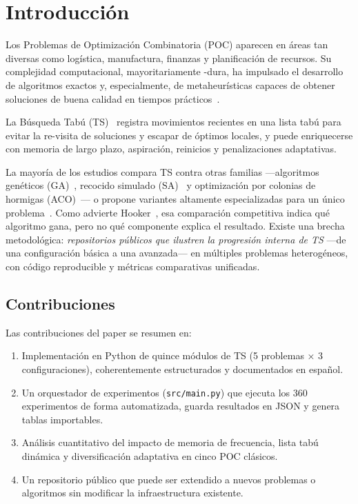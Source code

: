\section{Introducción}
\label{sec:intro}

Los Problemas de Optimización Combinatoria (POC) aparecen en áreas tan
diversas como logística, manufactura, finanzas y planificación de recursos.
Su complejidad computacional, mayoritariamente \NP-dura, ha impulsado el
desarrollo de algoritmos exactos y, especialmente, de metaheurísticas capaces
de obtener soluciones de buena calidad en tiempos
prácticos~\cite{gendreau2010handbook,blum2003metaheuristics}.

La Búsqueda Tabú (TS)~\cite{glover1986future,glover1989tabu,glover1990tabu}
registra movimientos recientes en una lista tabú para evitar la re-visita
de soluciones y escapar de óptimos locales, y puede enriquecerse con
memoria de largo plazo, aspiración, reinicios y penalizaciones adaptativas.

La mayoría de los estudios compara TS contra otras familias
—algoritmos genéticos (GA)~\cite{holland1975adaptation}, recocido simulado
(SA)~\cite{kirkpatrick1983optimization} y optimización por colonias de
hormigas (ACO)~\cite{dorigo1996ant}— o propone variantes altamente
especializadas para un único
problema~\cite{cordeau2002guide,gendreau1994tabu,nowicki1996fast}.
Como advierte Hooker~\cite{hooker1995testing}, esa comparación competitiva
indica qué algoritmo gana, pero no qué componente explica el resultado.
Existe una brecha metodológica: \emph{repositorios públicos que ilustren
la progresión interna de TS} —de una configuración básica a una avanzada—
en múltiples problemas heterogéneos, con código reproducible y métricas
comparativas unificadas.

\subsection*{Contribuciones}

Las contribuciones del paper se resumen en:

\begin{enumerate}
  \item Implementación en Python de quince módulos de TS (5 problemas × 3
    configuraciones), coherentemente estructurados y documentados en español.
  \item Un orquestador de experimentos (\texttt{src/main.py}) que ejecuta los
    360 experimentos de forma automatizada, guarda resultados en JSON y
    genera tablas importables.
  \item Análisis cuantitativo del impacto de memoria de frecuencia, lista
    tabú dinámica y diversificación adaptativa en cinco POC clásicos.
  \item Un repositorio público que puede ser extendido a nuevos problemas o
    algoritmos sin modificar la infraestructura existente.
\end{enumerate}

